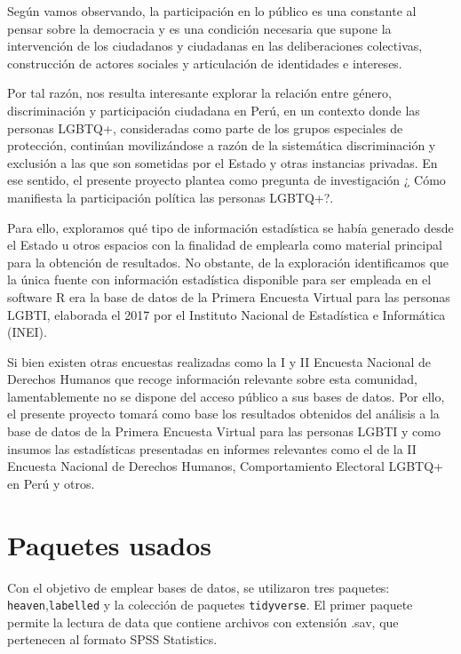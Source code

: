 \documentclass[
]{book}
\theoremstyle{definition}
\theoremstyle{definition}
\theoremstyle{definition}
\theoremstyle{definition}
\theoremstyle{remark}
\begin{document}
Según vamos observando, la participación en lo público es una constante al pensar sobre la democracia y es una condición necesaria que supone la intervención de los ciudadanos y ciudadanas en las deliberaciones colectivas, construcción de actores sociales y articulación de identidades e intereses.

Por tal razón, nos resulta interesante explorar la relación entre género, discriminación y participación ciudadana en Perú, en un contexto donde las personas LGBTQ+, consideradas como parte de los grupos especiales de protección, continúan movilizándose a razón de la sistemática discriminación y exclusión a las que son sometidas por el Estado y otras instancias privadas. En ese sentido, el presente proyecto plantea como pregunta de investigación ¿ Cómo manifiesta la participación política las personas LGBTQ+?.

Para ello, exploramos qué tipo de información estadística se había generado desde el Estado u otros espacios con la finalidad de emplearla como material principal para la obtención de resultados. No obstante, de la exploración identificamos que la única fuente con información estadística disponible para ser empleada en el software R era la base de datos de la Primera Encuesta Virtual para las personas LGBTI, elaborada el 2017 por el Instituto Nacional de Estadística e Informática (INEI).

Si bien existen otras encuestas realizadas como la I y II Encuesta Nacional de Derechos Humanos que recoge información relevante sobre esta comunidad, lamentablemente no se dispone del acceso público a sus bases de datos. Por ello, el presente proyecto tomará como base los resultados obtenidos del análisis a la base de datos de la Primera Encuesta Virtual para las personas LGBTI y como insumos las estadísticas presentadas en informes relevantes como el de la II Encuesta Nacional de Derechos Humanos, Comportamiento Electoral LGBTQ+ en Perú y otros.

\hypertarget{paquetes-usados}{%
\section{Paquetes usados}\label{paquetes-usados}}

Con el objetivo de emplear bases de datos, se utilizaron tres paquetes: \texttt{heaven},\texttt{labelled} y la colección de paquetes \texttt{tidyverse}. El primer paquete permite la lectura de data que contiene archivos con extensión .sav, que pertenecen al formato SPSS Statistics.
\end{document}
